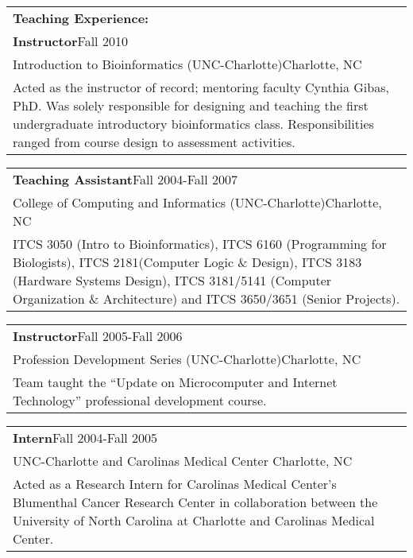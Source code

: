 \documentclass[12pt]{report}
\def\fullLength{6.5in}
\begin{document}
\begin{table}[!h]
\begin{tabular}{p{\fullLength}}
\textbf{\Large Teaching Experience:}\\
\textbf{Instructor}\hfill Fall 2010\\
Introduction to Bioinformatics (UNC-Charlotte)\hfill Charlotte, NC\\
Acted as the instructor of record; mentoring faculty Cynthia Gibas, PhD. Was solely responsible for designing and teaching the first undergraduate introductory bioinformatics class. Responsibilities ranged from course design to assessment activities.
\end{tabular}
\end{table}

\begin{table}[!h]
\begin{tabular}{p{\fullLength}}
\textbf{Teaching Assistant}\hfill Fall 2004-Fall 2007\\
College of Computing and Informatics (UNC-Charlotte)\hfill Charlotte, NC\\
ITCS 3050 (Intro to Bioinformatics), ITCS 6160 (Programming for Biologists), ITCS 2181(Computer Logic \& Design), ITCS 3183 (Hardware Systems Design), ITCS 3181/5141 (Computer Organization \& Architecture) and ITCS 3650/3651 (Senior Projects).\\
\end{tabular}
\end{table}

\begin{table}[!h]
\begin{tabular}{p{\fullLength}}
\textbf{Instructor}\hfill Fall 2005-Fall 2006\\
Profession Development Series (UNC-Charlotte)\hfill Charlotte, NC\\
Team taught the ``Update on Microcomputer and Internet Technology'' professional development course.\\
\end{tabular}
\end{table}

\begin{table}[!h]
\begin{tabular}{p{\fullLength}}
\textbf{Intern}\hfill Fall 2004-Fall 2005\\
UNC-Charlotte and Carolinas Medical Center \hfill Charlotte, NC\\
Acted as a Research Intern for Carolinas Medical Center’s Blumenthal Cancer Research Center in collaboration between the University of North Carolina at Charlotte and Carolinas Medical Center.
\end{tabular}
\end{table}
\end{document}
